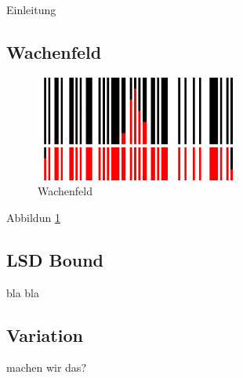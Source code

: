 Einleitung
\subsection[Wachenfeld]{Wachenfeld \cite{wachenfeld2008robust}}
\begin{figure}[t]
\center
\includegraphics[width=0.6\textwidth,natwidth=900,natheight=463]{img/wachenfeld.png}
\caption{Wachenfeld}
\label{wachenfeld}
\end{figure}
Abbildun \ref{wachenfeld}

\subsection{LSD Bound}
bla bla
\subsection{Variation}
machen wir das?